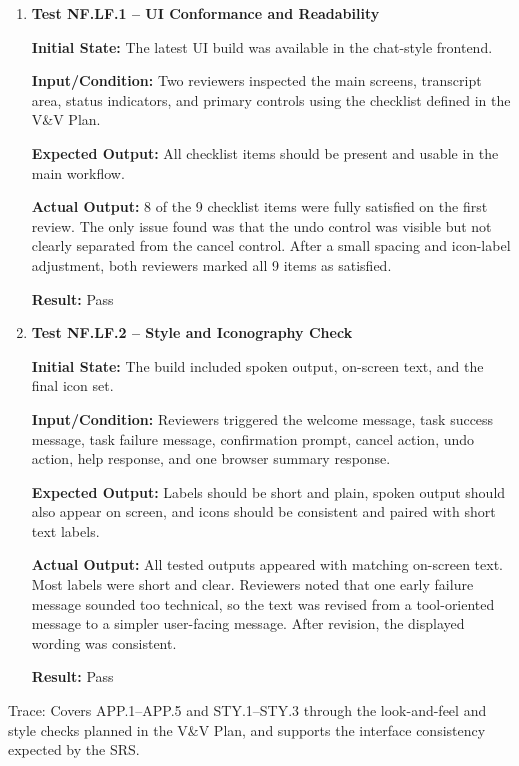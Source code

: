 \documentclass[12pt]{article}
\begin{document}
\begin{enumerate}
    \item \textbf{Test NF.LF.1 -- UI Conformance and Readability}
    
    \textbf{Initial State:} The latest UI build was available in the
    chat-style frontend.
    
    \textbf{Input/Condition:} Two reviewers inspected the main screens,
    transcript area, status indicators, and primary controls using the
    checklist defined in the V\&V Plan.
    
    \textbf{Expected Output:} All checklist items should be present and
    usable in the main workflow.
    
    \textbf{Actual Output:} 8 of the 9 checklist items were fully
    satisfied on the first review. The only issue found was that the
    undo control was visible but not clearly separated from the cancel
    control. After a small spacing and icon-label adjustment, both
    reviewers marked all 9 items as satisfied.
    
    \textbf{Result:} Pass

    \item \textbf{Test NF.LF.2 -- Style and Iconography Check}
    
    \textbf{Initial State:} The build included spoken output,
    on-screen text, and the final icon set.
    
    \textbf{Input/Condition:} Reviewers triggered the welcome message,
    task success message, task failure message, confirmation prompt,
    cancel action, undo action, help response, and one browser summary
    response.
    
    \textbf{Expected Output:} Labels should be short and plain, spoken
    output should also appear on screen, and icons should be
    consistent and paired with short text labels.
    
    \textbf{Actual Output:} All tested outputs appeared with matching
    on-screen text. Most labels were short and clear. Reviewers noted
    that one early failure message sounded too technical, so the text
    was revised from a tool-oriented message to a simpler user-facing
    message. After revision, the displayed wording was consistent.
    
    \textbf{Result:} Pass
\end{enumerate}

\noindent Trace: Covers APP.1--APP.5 and STY.1--STY.3 through the
look-and-feel and style checks planned in the V\&V Plan, and
supports the interface consistency expected by the SRS.
\end{document}
